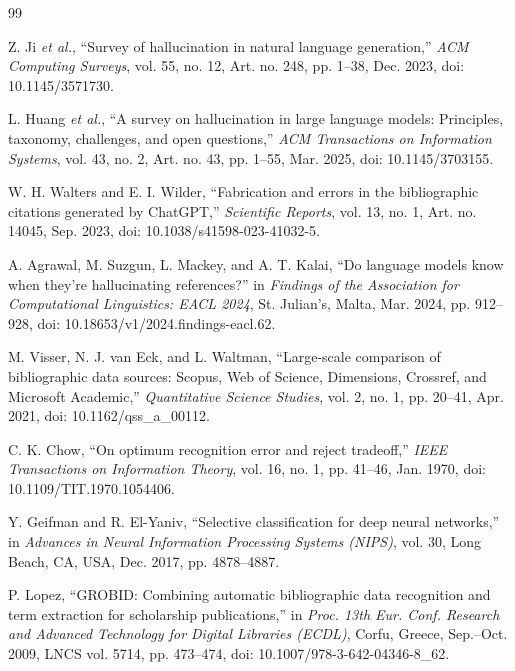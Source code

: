 \renewcommand\bibname{REFERENCES}
\clearpage
{}
\addcontentsline{toc}{chapter}{\bibname}
\begin{thebibliography}{99}

Z. Ji \textit{et al.}, ``Survey of hallucination in natural language generation,'' \textit{ACM Computing Surveys}, vol. 55, no. 12, Art. no. 248, pp. 1--38, Dec. 2023, doi: 10.1145/3571730.

L. Huang \textit{et al.}, ``A survey on hallucination in large language models: Principles, taxonomy, challenges, and open questions,'' \textit{ACM Transactions on Information Systems}, vol. 43, no. 2, Art. no. 43, pp. 1--55, Mar. 2025, doi: 10.1145/3703155.

W. H. Walters and E. I. Wilder, ``Fabrication and errors in the bibliographic citations generated by ChatGPT,'' \textit{Scientific Reports}, vol. 13, no. 1, Art. no. 14045, Sep. 2023, doi: 10.1038/s41598-023-41032-5.

A. Agrawal, M. Suzgun, L. Mackey, and A. T. Kalai, ``Do language models know when they're hallucinating references?'' in \textit{Findings of the Association for Computational Linguistics: EACL 2024}, St. Julian's, Malta, Mar. 2024, pp. 912--928, doi: 10.18653/v1/2024.findings-eacl.62.

M. Visser, N. J. van Eck, and L. Waltman, ``Large-scale comparison of bibliographic data sources: Scopus, Web of Science, Dimensions, Crossref, and Microsoft Academic,'' \textit{Quantitative Science Studies}, vol. 2, no. 1, pp. 20--41, Apr. 2021, doi: 10.1162/qss\_a\_00112.

C. K. Chow, ``On optimum recognition error and reject tradeoff,'' \textit{IEEE Transactions on Information Theory}, vol. 16, no. 1, pp. 41--46, Jan. 1970, doi: 10.1109/TIT.1970.1054406.

Y. Geifman and R. El-Yaniv, ``Selective classification for deep neural networks,'' in \textit{Advances in Neural Information Processing Systems (NIPS)}, vol. 30, Long Beach, CA, USA, Dec. 2017, pp. 4878--4887.

P. Lopez, ``GROBID: Combining automatic bibliographic data recognition and term extraction for scholarship publications,'' in \textit{Proc. 13th Eur. Conf. Research and Advanced Technology for Digital Libraries (ECDL)}, Corfu, Greece, Sep.--Oct. 2009, LNCS vol. 5714, pp. 473--474, doi: 10.1007/978-3-642-04346-8\_62.


\end{thebibliography}
